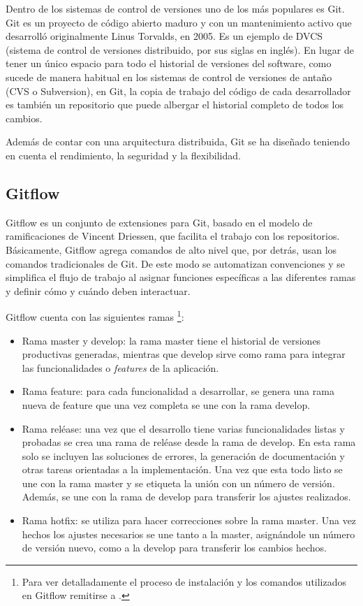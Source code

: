 Dentro de los sistemas de control de versiones uno de los más populares es Git. Git es un proyecto de código abierto maduro y con un mantenimiento activo que desarrolló originalmente Linus Torvalds, en 2005. Es un ejemplo de DVCS (sistema de control de versiones distribuido, por sus siglas en inglés). En lugar de tener un único espacio para todo el historial de versiones del software, como sucede de manera habitual en los sistemas de control de versiones de antaño (CVS o Subversion), en Git, la copia de trabajo del código de cada desarrollador es también un repositorio que puede albergar el historial completo de todos los cambios. 

Además de contar con una arquitectura distribuida, Git se ha diseñado teniendo en cuenta el rendimiento, la seguridad y la flexibilidad.

\subsection{Gitflow}

Gitflow es un conjunto de extensiones para Git, basado en el modelo de ramificaciones de Vincent Driessen, que facilita el trabajo con los repositorios. Básicamente, Gitflow agrega comandos de alto nivel que, por detrás, usan los comandos tradicionales de Git. De este modo se automatizan convenciones y se simplifica el flujo de trabajo al asignar funciones específicas a las diferentes ramas y definir cómo y cuándo deben interactuar.

Gitflow cuenta con las siguientes ramas \footnote{Para ver detalladamente el proceso de instalación y los comandos utilizados en Gitflow remitirse a \citep{WEBSITE:GitflowDetalle}.}: 

\begin{itemize}
\item Rama master y develop: la rama master tiene el historial de versiones productivas generadas, mientras que develop sirve como rama para integrar las funcionalidades o \textit{features} de la aplicación. 
\item Rama feature: para cada funcionalidad a desarrollar, se genera una rama nueva de feature que una vez completa se une con la rama develop.
\item Rama reléase: una vez que el desarrollo tiene varias funcionalidades listas y probadas se crea una rama de reléase desde la rama de develop. En esta rama solo se incluyen las soluciones de errores, la generación de documentación y otras tareas orientadas a la implementación. Una vez que esta todo listo se une con la rama master y se etiqueta la unión con un número de versión. Además, se une con la rama de develop para transferir los ajustes realizados. 
\item Rama hotfix: se utiliza para hacer correcciones sobre la rama master. Una vez hechos los ajustes necesarios se une tanto a la master, asignándole un número de versión nuevo, como a la develop para transferir los cambios hechos.
\end{itemize}

